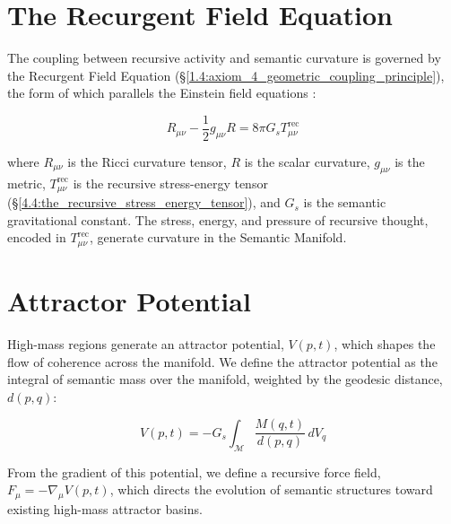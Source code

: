 
\section{The Recurgent Field Equation}
\label{5.3:the_recurgent_field_equation}

The coupling between recursive activity and semantic curvature is governed by the Recurgent Field Equation (\S\ref{1.4:axiom_4_geometric_coupling_principle}), the form of which parallels the Einstein field equations \autocite{Einstein1915, MisnerThorneWheeler1973, Wald1984}:

\begin{equation}
R_{\mu\nu} - \frac{1}{2}g_{\mu\nu}R = 8\pi G_s T^{\text{rec}}_{\mu\nu}
\end{equation}

where \(R_{\mu\nu}\) is the Ricci curvature tensor, \(R\) is the scalar curvature, \(g_{\mu\nu}\) is the metric, \(T^{\text{rec}}_{\mu\nu}\) is the recursive stress-energy tensor (\S\ref{4.4:the_recursive_stress_energy_tensor}), and \(G_s\) is the semantic gravitational constant. The stress, energy, and pressure of recursive thought, encoded in \(T^{\text{rec}}_{\mu\nu}\), generate curvature in the Semantic Manifold.


\section{Attractor Potential}
\label{5.4:attractor_potential}

High-mass regions generate an attractor potential, \(V(p,t)\), which shapes the flow of coherence across the manifold. We define the attractor potential as the integral of semantic mass over the manifold, weighted by the geodesic distance, \(d(p, q)\):

\begin{equation}
V(p, t) = -G_s \int_{\mathcal{M}} \frac{M(q, t)}{d(p, q)} \, dV_q
\end{equation}

From the gradient of this potential, we define a recursive force field, \(F_\mu = -\nabla_\mu V(p,t)\), which directs the evolution of semantic structures toward existing high-mass attractor basins.


